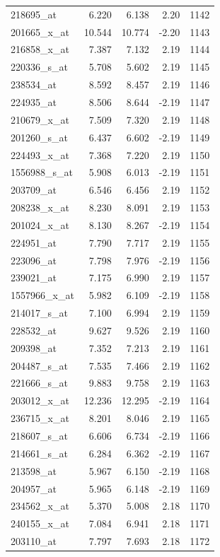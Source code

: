 \begin{footnotesize}
\begin{longtable}{lrrrr}
218695\_at & 6.220 & 6.138 & 2.20 & 1142 \\
201665\_x\_at & 10.544 & 10.774 & -2.20 & 1143 \\
216858\_x\_at & 7.387 & 7.132 & 2.19 & 1144 \\
220336\_s\_at & 5.708 & 5.602 & 2.19 & 1145 \\
238534\_at & 8.592 & 8.457 & 2.19 & 1146 \\
224935\_at & 8.506 & 8.644 & -2.19 & 1147 \\
210679\_x\_at & 7.509 & 7.320 & 2.19 & 1148 \\
201260\_s\_at & 6.437 & 6.602 & -2.19 & 1149 \\
224493\_x\_at & 7.368 & 7.220 & 2.19 & 1150 \\
1556988\_s\_at & 5.908 & 6.013 & -2.19 & 1151 \\
203709\_at & 6.546 & 6.456 & 2.19 & 1152 \\
208238\_x\_at & 8.230 & 8.091 & 2.19 & 1153 \\
201024\_x\_at & 8.130 & 8.267 & -2.19 & 1154 \\
224951\_at & 7.790 & 7.717 & 2.19 & 1155 \\
223096\_at & 7.798 & 7.976 & -2.19 & 1156 \\
239021\_at & 7.175 & 6.990 & 2.19 & 1157 \\
1557966\_x\_at & 5.982 & 6.109 & -2.19 & 1158 \\
214017\_s\_at & 7.100 & 6.994 & 2.19 & 1159 \\
228532\_at & 9.627 & 9.526 & 2.19 & 1160 \\
209398\_at & 7.352 & 7.213 & 2.19 & 1161 \\
204487\_s\_at & 7.535 & 7.466 & 2.19 & 1162 \\
221666\_s\_at & 9.883 & 9.758 & 2.19 & 1163 \\
203012\_x\_at & 12.236 & 12.295 & -2.19 & 1164 \\
236715\_x\_at & 8.201 & 8.046 & 2.19 & 1165 \\
218607\_s\_at & 6.606 & 6.734 & -2.19 & 1166 \\
214661\_s\_at & 6.284 & 6.362 & -2.19 & 1167 \\
213598\_at & 5.967 & 6.150 & -2.19 & 1168 \\
204957\_at & 5.965 & 6.148 & -2.19 & 1169 \\
234562\_x\_at & 5.370 & 5.008 & 2.18 & 1170 \\
240155\_x\_at & 7.084 & 6.941 & 2.18 & 1171 \\
203110\_at & 7.797 & 7.693 & 2.18 & 1172 \\

\end{longtable}
\end{footnotesize}
